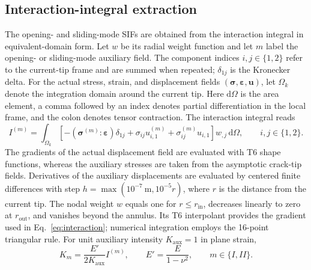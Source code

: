 \documentclass[11pt]{article}
\newcommand{\dd}{\mathrm{d}}
\begin{document}
\subsection{Interaction-integral extraction}
The opening- and sliding-mode SIFs are obtained from the
interaction integral in equivalent-domain form. Let $w$ be its
radial weight function and let $m$ label the opening- or sliding-mode
auxiliary field. The component indices $i,j\in\{1,2\}$ refer
to the current-tip frame and are summed when repeated;
$\delta_{1j}$ is the Kronecker delta. For the actual stress,
strain, and displacement fields
$(\bm\sigma,\bm\varepsilon,\bm u)$, let $\Omega_k$ denote the integration
domain around the current tip. Here $\dd\Omega$ is the area element,
a comma followed by an index denotes partial differentiation in the
local frame, and the colon denotes tensor contraction. The interaction
integral reads
\begin{equation}
 I^{(m)}=\int_{\Omega_k}
 \left[-(\bm\sigma^{(m)}\!:\bm\varepsilon)\delta_{1j}
 +\sigma_{ij}u^{(m)}_{i,1}
 +\sigma^{(m)}_{ij}u_{i,1}\right]w_{,j}\,\dd\Omega,
 \qquad i,j\in\{1,2\}.\label{eq:interaction}
\end{equation}
The gradients of the actual displacement field are evaluated with
T6 shape functions, whereas the auxiliary stresses are taken from
the asymptotic crack-tip fields. Derivatives of the auxiliary
displacements are evaluated by centered finite differences with
step $h=\max(10^{-7}\ \mathrm m,10^{-5}r)$, where $r$ is the
distance from the current tip. The nodal weight $w$ equals one for
$r\leq r_{\mathrm{in}}$, decreases linearly to zero at
$r_{\mathrm{out}}$, and vanishes beyond the annulus.
Its T6 interpolant provides the gradient used in
Eq.~\eqref{eq:interaction}; numerical integration employs the
16-point triangular rule. For unit auxiliary intensity
$K_{\mathrm{aux}}=1$ in plane strain,
\begin{equation}
 K_m=\frac{E'}{2K_{\mathrm{aux}}}I^{(m)},\qquad
 E'=\frac{E}{1-\nu^2},\qquad m\in\{I,II\}.\label{eq:normalization}
\end{equation}
\end{document}
